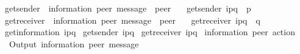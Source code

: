 \begin{isabellebody}
\ get{\isacharunderscore}{\kern0pt}sender\ {\isacharcolon}{\kern0pt}{\isacharcolon}{\kern0pt}\ {\isachardoublequoteopen}{\isacharparenleft}{\kern0pt}{\isacharprime}{\kern0pt}information{\isacharcomma}{\kern0pt}\ {\isacharprime}{\kern0pt}peer{\isacharparenright}{\kern0pt}\ message\ {\isasymRightarrow}\ {\isacharprime}{\kern0pt}peer{\isachardoublequoteclose}\ \isanewline
\ \ {\isachardoublequoteopen}get{\isacharunderscore}{\kern0pt}sender\ {\isacharparenleft}{\kern0pt}i\isactrlbsup p{\isasymrightarrow}q\isactrlesup {\isacharparenright}{\kern0pt}\ {\isacharequal}{\kern0pt}\ p{\isachardoublequoteclose}\isanewline
\isanewline
{}\isamarkupfalse%
\ get{\isacharunderscore}{\kern0pt}receiver\ {\isacharcolon}{\kern0pt}{\isacharcolon}{\kern0pt}\ {\isachardoublequoteopen}{\isacharparenleft}{\kern0pt}{\isacharprime}{\kern0pt}information{\isacharcomma}{\kern0pt}\ {\isacharprime}{\kern0pt}peer{\isacharparenright}{\kern0pt}\ message\ {\isasymRightarrow}\ {\isacharprime}{\kern0pt}peer{\isachardoublequoteclose}\ \isanewline
\ \ {\isachardoublequoteopen}get{\isacharunderscore}{\kern0pt}receiver\ {\isacharparenleft}{\kern0pt}i\isactrlbsup p{\isasymrightarrow}q\isactrlesup {\isacharparenright}{\kern0pt}\ {\isacharequal}{\kern0pt}\ q{\isachardoublequoteclose}\isanewline
\isanewline
{}\isamarkupfalse%
\ {\isachardoublequoteopen}get{\isacharunderscore}{\kern0pt}information\ {\isacharparenleft}{\kern0pt}i\isactrlbsup p{\isasymrightarrow}q\isactrlesup {\isacharparenright}{\kern0pt}{\isachardoublequoteclose}\isanewline
{}\isamarkupfalse%
\ {\isachardoublequoteopen}get{\isacharunderscore}{\kern0pt}sender\ {\isacharparenleft}{\kern0pt}i\isactrlbsup p{\isasymrightarrow}q\isactrlesup {\isacharparenright}{\kern0pt}{\isachardoublequoteclose}\isanewline
{}\isamarkupfalse%
\ {\isachardoublequoteopen}get{\isacharunderscore}{\kern0pt}receiver\ {\isacharparenleft}{\kern0pt}i\isactrlbsup p{\isasymrightarrow}q\isactrlesup {\isacharparenright}{\kern0pt}{\isachardoublequoteclose}\isanewline
\isanewline
{}\isamarkupfalse%
\ {\isacharparenleft}{\kern0pt}{\isacharprime}{\kern0pt}information{\isacharcomma}{\kern0pt}\ {\isacharprime}{\kern0pt}peer{\isacharparenright}{\kern0pt}\ action\ {\isacharequal}{\kern0pt}\isanewline
\ \ Output\ {\isachardoublequoteopen}{\isacharparenleft}{\kern0pt}{\isacharprime}{\kern0pt}information{\isacharcomma}{\kern0pt}\ {\isacharprime}{\kern0pt}peer{\isacharparenright}{\kern0pt}\ message{\isachardoublequoteclose}\ \ {\isacharparenleft}{\kern0pt}{\isachardoublequoteopen}{\isacharbang}{\kern0pt}{\isasymlangle}{\isacharunderscore}{\kern0pt}{\isasymrangle}{\isachardoublequoteclose}\ {\isacharbrackleft}{\kern0pt}{}{}{}{\isacharbrackright}{\kern0pt}\ {}{}{}{\isacharparenright}{\kern0pt}\ {\isacharbar}{\kern0pt}\isanewline

\end{isabellebody}
